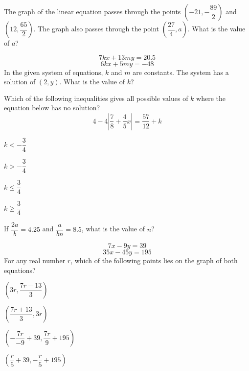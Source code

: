 \vfill
\noindent\begin{minipage}{\linewidth}
\par\smallskip
The graph of the linear equation passes through the points $\left(-21,-\dfrac{89}{2}\right)$ and $\left(12,\dfrac{65}{2}\right)$. The graph also passes through the point $\left(\dfrac{27}{4},a\right)$. What is the value of $a$?
\end{minipage}
\vfill
\clearpage
\noindent\begin{minipage}{\linewidth}
\par\smallskip
$$7kx+13my=20.5$$ $$6kx+5my=-48$$ In the given system of equations, $k$ and $m$ are constants. The system has a solution of $(2,y)$. What is the value of $k$?
\end{minipage}
\vfill
\noindent\begin{minipage}{\linewidth}
\par\smallskip
Which of the following inequalities gives all possible values of $k$ where the equation below has no solution? $$4-4\left|\frac{7}{8}+\frac{4}{5}x\right|=\frac{57}{12}+k$$
\begin{satchoices}
  \item[A)] $k<-\dfrac{3}{4}$
  \item[B)] $k>-\dfrac{3}{4}$
  \item[C)] $k\le\dfrac{3}{4}$
  \item[D)] $k\ge\dfrac{3}{4}$
\end{satchoices}
\end{minipage}
\vfill
\noindent\begin{minipage}{\linewidth}
\par\smallskip
If $\dfrac{2a}{b}=4.25$ and $\dfrac{a}{bn}=8.5$, what is the value of $n$?
\end{minipage}
\vfill
\clearpage
\noindent\begin{minipage}{\linewidth}
\par\smallskip
$$7x-9y=39$$ $$35x-45y=195$$ For any real number $r$, which of the following points lies on the graph of both equations?
\begin{satchoices}
  \item[A)] $\left(3r,\dfrac{7r-13}{3}\right)$
  \item[B)] $\left(\dfrac{7r+13}{3},3r\right)$
  \item[C)] $\left(-\dfrac{7r}{-9}+39,\dfrac{7r}{9}+195\right)$
  \item[D)] $\left(\dfrac{r}{5}+39,-\dfrac{r}{5}+195\right)$
\end{satchoices}
\end{minipage}
